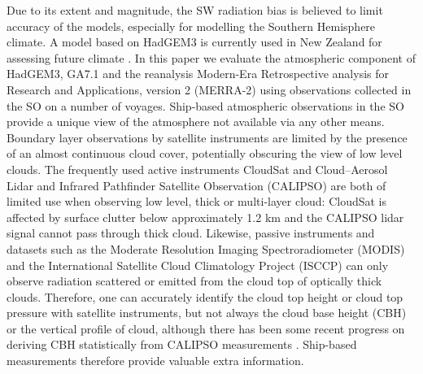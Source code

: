 Due to its extent and magnitude, the SW radiation bias is believed to limit 
accuracy of the models, especially for modelling the Southern Hemisphere
climate. A model based on HadGEM3 is currently used in New Zealand for assessing
future climate \citep{williams2016}.
In this paper we evaluate the atmospheric component of HadGEM3, GA7.1
\citep{walters2017} and the reanalysis Modern-Era Retrospective analysis for
Research and Applications, version 2 (MERRA-2) using observations collected in
the SO on a number of voyages. Ship-based atmospheric observations in the SO
provide a unique view of the atmosphere not available via any other means.
Boundary layer observations by satellite instruments are limited by the presence
of an almost continuous cloud cover, potentially obscuring the view of low level
clouds. The frequently used active instruments CloudSat \citep{stephens2002} and
Cloud--Aerosol Lidar and Infrared Pathfinder Satellite Observation (CALIPSO)
\citep{winker2010} are both of limited use when observing low level, thick or
multi-layer cloud: CloudSat is affected by surface clutter below approximately
1.2 \unit{km} \citep{marchand2008} and the CALIPSO lidar signal cannot pass
through thick cloud. Likewise, passive instruments and datasets such as the
Moderate Resolution Imaging Spectroradiometer (MODIS) \citep{salomonson2002} and
the International Satellite Cloud Climatology Project (ISCCP) \citep{rossow1999}
can only observe radiation scattered or emitted from the cloud top of optically
thick clouds. Therefore, one can accurately identify the cloud top height or
cloud top pressure with satellite instruments, but not always the cloud base
height (CBH) or the vertical profile of cloud, although there has been some
recent progress on deriving CBH statistically from CALIPSO measurements
\citep{mulmenstadt2018}. Ship-based measurements therefore provide valuable
extra information.

